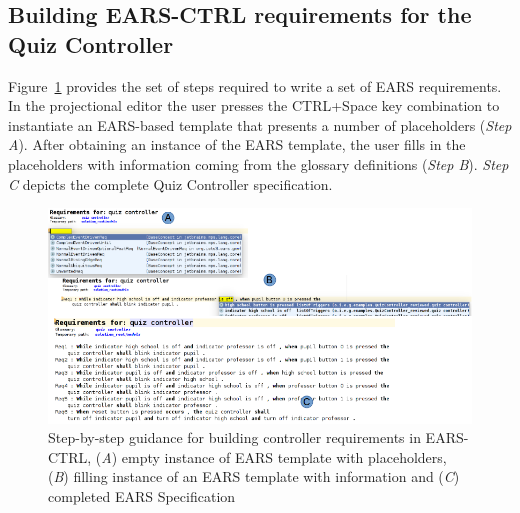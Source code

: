\subsection{Building \textsf{EARS-CTRL} requirements for the Quiz Controller}
\vspace{-.2cm}
Figure~\ref{fig:EARS_req} provides the set of steps required to write a set of
EARS requirements. In the projectional editor the user presses the CTRL+Space
key combination to instantiate an EARS-based template that presents a number of
placeholders (\emph{Step A}). After obtaining
an instance of the EARS template, the user fills in the placeholders with
information coming from the glossary definitions (\emph{Step B}). \emph{Step C}
depicts the complete Quiz Controller specification.
\begin{figure}[!h]
\centering
\includegraphics[width=1.2\textwidth]{./images/Req_Spec_Steps.png}
\caption{Step-by-step guidance for building controller requirements in
\textsf{EARS-CTRL}, (\emph{A}) empty instance of EARS template with placeholders, (\emph{B}) filling instance
of an EARS template with information and (\emph{C}) completed EARS Specification
}
\label{fig:EARS_req}
\vspace{-.6cm}
\end{figure}
\vspace{-.2cm}
